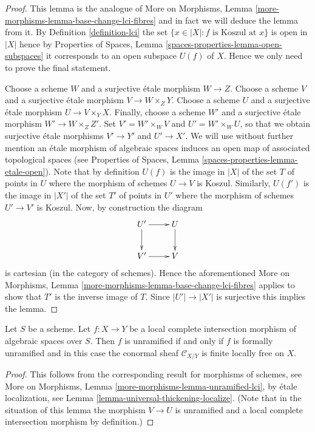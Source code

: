 \begin{proof}
This lemma is the analogue of
More on Morphisms, Lemma \ref{more-morphisms-lemma-base-change-lci-fibres}
and in fact we will deduce the lemma from it. By
Definition \ref{definition-lci}
the set $\{x \in |X| : f \text{ is Koszul at }x\}$ is
open in $|X|$ hence by
Properties of Spaces, Lemma \ref{spaces-properties-lemma-open-subspaces}
it corresponds to an open subspace $U(f)$ of $X$. Hence we only need to
prove the final statement.

\medskip\noindent
Choose a scheme $W$ and a surjective \'etale morphism $W \to Z$.
Choose a scheme $V$ and a surjective \'etale morphism $V \to W \times_Z Y$.
Choose a scheme $U$ and a surjective \'etale morphism $U \to V \times_Y X$.
Finally, choose a scheme $W'$ and a surjective \'etale morphism
$W' \to W \times_Z Z'$.
Set $V' = W' \times_W V$ and $U' = W' \times_W U$, so that we obtain
surjective \'etale morphisms $V' \to Y'$ and $U' \to X'$.
We will use without further mention an \'etale morphism of algebraic spaces
induces an open map of associated topological spaces (see
Properties of Spaces, Lemma
\ref{spaces-properties-lemma-etale-open}).
Note that by definition $U(f)$ is the image in $|X|$ of the set $T$
of points in $U$ where the morphism of schemes $U \to V$ is Koszul.
Similarly, $U(f')$ is the image in $|X'|$ of the set $T'$ of points in
$U'$ where the morphism of schemes $U' \to V'$ is Koszul. Now, by construction
the diagram
$$
\xymatrix{
U' \ar[r] \ar[d] & U \ar[d] \\
V' \ar[r] & V
}
$$
is cartesian (in the category of schemes). Hence the aforementioned
More on Morphisms, Lemma \ref{more-morphisms-lemma-base-change-lci-fibres}
applies to show that $T'$ is the inverse image of $T$. Since
$|U'| \to |X'|$ is surjective this implies the lemma.
\end{proof}

\begin{lemma}
\label{lemma-unramified-lci}
Let $S$ be a scheme. Let $f : X \to Y$ be a local complete intersection
morphism of algebraic spaces over $S$. Then $f$ is unramified if and only
if $f$ is formally unramified and in this case the conormal sheaf
$\mathcal{C}_{X/Y}$ is finite locally free on $X$.
\end{lemma}

\begin{proof}
This follows from the corresponding result for morphisms of schemes, see
More on Morphisms, Lemma \ref{more-morphisms-lemma-unramified-lci},
by \'etale localization, see
Lemma \ref{lemma-universal-thickening-localize}.
(Note that in the situation of this lemma the morphism $V \to U$
is unramified and a local complete intersection morphism by definition.)
\end{proof}

